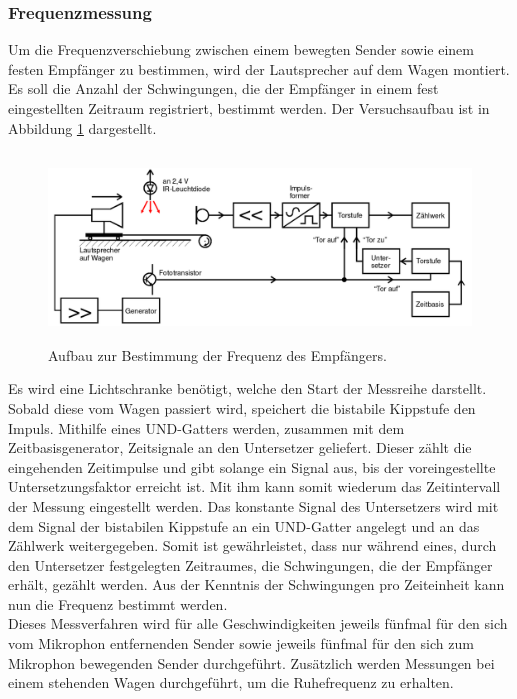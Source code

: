 \subsubsection{Frequenzmessung}
\label{sec:durch_fre}
Um die Frequenzverschiebung zwischen einem bewegten Sender sowie einem festen Empfänger zu bestimmen, wird der Lautsprecher auf dem Wagen montiert.
Es soll die Anzahl der Schwingungen, die der Empfänger in einem fest eingestellten Zeitraum registriert, bestimmt werden.
Der Versuchsaufbau ist in Abbildung \ref{tfig:2} dargestellt.
\begin{figure}
  \centering
  \includegraphics[height=5cm]{aufbau2.png}
  \caption{Aufbau zur Bestimmung der Frequenz des Empfängers. \cite{sample}}
  \label{tfig:2}
\end{figure}
Es wird eine Lichtschranke benötigt, welche den Start der Messreihe darstellt.
Sobald diese vom Wagen passiert wird, speichert die bistabile Kippstufe den Impuls.
Mithilfe eines UND-Gatters werden, zusammen mit dem Zeitbasisgenerator, Zeitsignale an den Untersetzer geliefert.
Dieser zählt die eingehenden Zeitimpulse und gibt solange ein Signal aus, bis der voreingestellte Untersetzungsfaktor erreicht ist.
Mit ihm kann somit wiederum das Zeitintervall der Messung eingestellt werden.
Das konstante Signal des Untersetzers wird mit dem Signal der bistabilen Kippstufe an ein UND-Gatter angelegt und an das Zählwerk weitergegeben.
Somit ist gewährleistet, dass nur während eines, durch den Untersetzer festgelegten Zeitraumes, die Schwingungen, die der Empfänger erhält, gezählt werden.
Aus der Kenntnis der Schwingungen pro Zeiteinheit kann nun die Frequenz bestimmt werden.\\
Dieses Messverfahren wird für alle Geschwindigkeiten jeweils fünfmal für den sich vom Mikrophon entfernenden Sender sowie jeweils fünfmal für den sich zum Mikrophon bewegenden Sender durchgeführt.
Zusätzlich werden Messungen bei einem stehenden Wagen durchgeführt, um die Ruhefrequenz zu erhalten.

